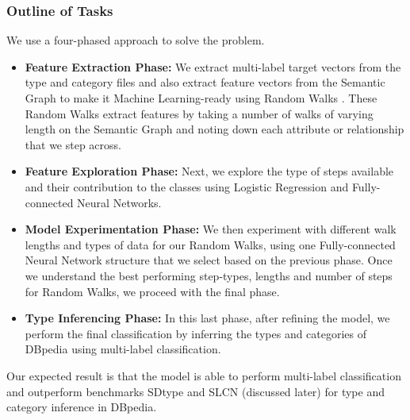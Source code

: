 \documentclass[runningheads,a4paper]{IEEEtran}
\begin{document}
\subsubsection{Outline of Tasks} We use a four-phased approach to solve the problem. 
\begin{itemize}
\item \textbf{Feature Extraction Phase:} We extract multi-label target vectors from the type and category files and also extract feature vectors from the Semantic Graph to make it Machine Learning-ready using Random Walks \cite{tsuda2010graph}. These Random Walks extract features by taking a number of walks of varying length on the Semantic Graph and noting down each attribute or relationship that we step across. 
\item \textbf{Feature Exploration Phase:} Next, we explore the type of steps available and their contribution to the classes using Logistic Regression and Fully-connected Neural Networks. 
\item \textbf{Model Experimentation Phase:} We then experiment with different walk lengths and types of data for our Random Walks, using one Fully-connected Neural Network structure that we select based on the previous phase. Once we understand the best performing step-types, lengths and number of steps for Random Walks, we proceed with the final phase.
\item \textbf{Type Inferencing Phase:} In this last phase, after refining the model, we perform the final classification by inferring the types and categories of DBpedia using multi-label classification. 
\end{itemize}

Our expected result is that the model is able to perform multi-label classification and outperform benchmarks SDtype\cite{paulheim2013type} and SLCN\cite{melo2016type} (discussed later) for type and category inference in DBpedia. 
\end{document}
